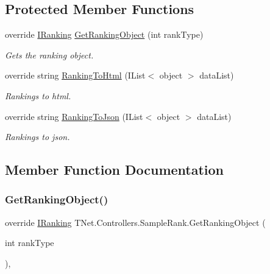 \subsection*{Protected Member Functions}
\begin{DoxyCompactItemize}
\item 
override \mbox{\hyperlink{interface_t_net_1_1_com_1_1_rank_1_1_i_ranking}{I\+Ranking}} \mbox{\hyperlink{class_t_net_1_1_controllers_1_1_sample_rank_a29b6d1de9fab8703d209385b6a8de185}{Get\+Ranking\+Object}} (int rank\+Type)
\begin{DoxyCompactList}\small\item\em Gets the ranking object. \end{DoxyCompactList}\item 
override string \mbox{\hyperlink{class_t_net_1_1_controllers_1_1_sample_rank_ae2de6cc2ed3dcdcd29f6df49c406da07}{Ranking\+To\+Html}} (I\+List$<$ object $>$ data\+List)
\begin{DoxyCompactList}\small\item\em Rankings to html. \end{DoxyCompactList}\item 
override string \mbox{\hyperlink{class_t_net_1_1_controllers_1_1_sample_rank_ae6bc5f73a0068ef27537e742cbff29be}{Ranking\+To\+Json}} (I\+List$<$ object $>$ data\+List)
\begin{DoxyCompactList}\small\item\em Rankings to json. \end{DoxyCompactList}\end{DoxyCompactItemize}


\subsection{Member Function Documentation}
\mbox{\label{class_t_net_1_1_controllers_1_1_sample_rank_a29b6d1de9fab8703d209385b6a8de185}} 
\subsubsection{\texorpdfstring{Get\+Ranking\+Object()}{GetRankingObject()}}
{\footnotesize\ttfamily override \mbox{\hyperlink{interface_t_net_1_1_com_1_1_rank_1_1_i_ranking}{I\+Ranking}} T\+Net.\+Controllers.\+Sample\+Rank.\+Get\+Ranking\+Object (\begin{DoxyParamCaption}\item[{int}]{rank\+Type }\end{DoxyParamCaption})\hspace{0.3cm}{\ttfamily [protected]}, {\ttfamily [virtual]}}



